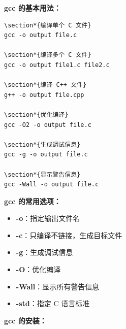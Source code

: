 \documentclass[12pt,UTF8]{ctexbook}
\begin{document}
\textbf{gcc 的基本用法：}
\begin{verbatim}
\section*{编译单个 C 文件}
gcc -o output file.c

\section*{编译多个 C 文件}
gcc -o output file1.c file2.c

\section*{编译 C++ 文件}
g++ -o output file.cpp

\section*{优化编译}
gcc -O2 -o output file.c

\section*{生成调试信息}
gcc -g -o output file.c

\section*{显示警告信息}
gcc -Wall -o output file.c
\end{verbatim}

\textbf{gcc 的常用选项：}
\begin{itemize}
    \item \textbf{-o}：指定输出文件名
    \item \textbf{-c}：只编译不链接，生成目标文件
    \item \textbf{-g}：生成调试信息
    \item \textbf{-O}：优化编译
    \item \textbf{-Wall}：显示所有警告信息
    \item \textbf{-std}：指定 C 语言标准
\end{itemize}

\textbf{gcc 的安装：}
\end{document}
